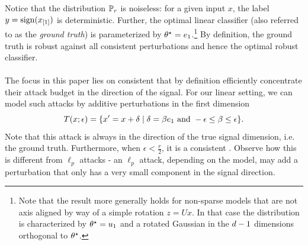 Notice that the distribution $\mathbb{P}_{r}$ is noiseless: for a given input
$x$, the label $y = \operatorname*{sign}(x_{[1]})$ is deterministic. Further, the
optimal linear classifier (also referred to as the \emph{ground
  truth}) is parameterized by $\theta^{\star} = e_1$.\footnote{Note that the result more generally holds for non-sparse models that are not axis aligned by way of a simple rotation $z = U x$. In that case the distribution is characterized by $\theta^\star = u_1$ and a rotated Gaussian in the $d-1$ dimensions orthogonal to $\theta^\star$.} By definition, the ground truth is
robust against all consistent perturbations and hence the optimal
robust classifier.





\paragraph{\nameofattackscapital}  
The focus in this paper lies on consistent \nameofattacks that by
definition efficiently concentrate their attack budget in the
direction of the signal.  For our linear setting, we can model such
attacks by  additive perturbations in the first dimension
\begin{equation}
  \label{eq:linfmaxpert}
  T({x};{\epsilon}) = \{x'=x+\delta  \mid \delta = \beta e_1 \text{ and } -\epsilon \leq \beta\leq \epsilon\}.
\end{equation}
Note that this attack is always in the direction of the true signal dimension, i.e. the ground truth. Furthermore, when  $\epsilon < \frac{r}{2}$, it is a consistent \nameofattack.
Observe how this is different from $\ell_p$ attacks - an $\ell_p$ attack, depending on the model, may add a perturbation that only has a very small component in the signal direction. 

